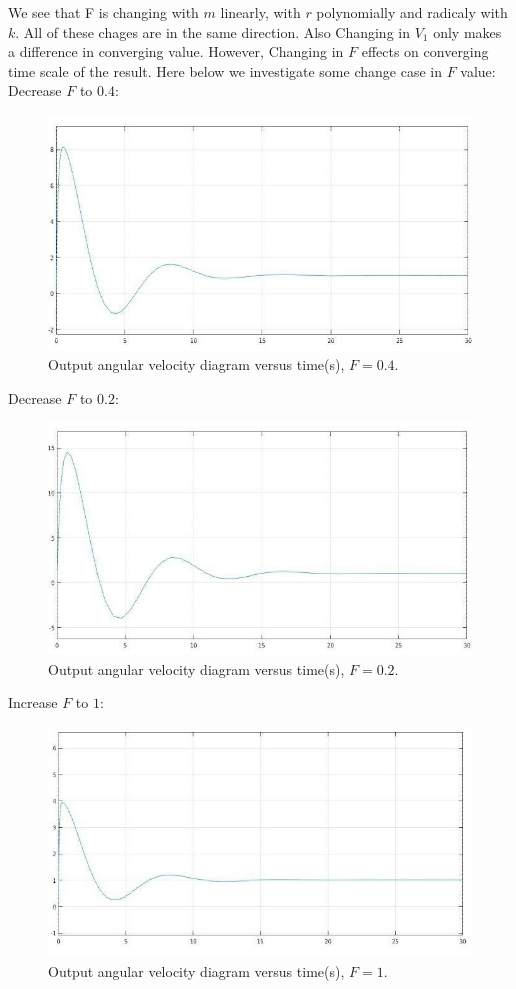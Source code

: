 \documentclass[11pt]{scrartcl} %
\begin{document}
We see that F is changing with $m$ linearly, with $r$ polynomially and radicaly with $k$. All of these chages are in the same direction. Also Changing in $V_1$ only makes a difference in converging value. However, Changing in $F$ effects on converging time scale of the result. Here below  we investigate some change case in $F$ value:\\
\newline
Decrease $F$ to $0.4$:
\begin{figure}[h] 
	\centering
	\includegraphics[width=0.6\columnwidth]{images/p12.jpg}
	\caption{Output angular velocity diagram versus time(s), $F = 0.4$.}
\end{figure}
\newpage
Decrease $F$ to $0.2$:
\begin{figure}[h] 
	\centering
	\includegraphics[width=0.6\columnwidth]{images/p11.jpg}
	\caption{Output angular velocity diagram versus time(s), $F = 0.2$.}
\end{figure} \newline
Increase $F$ to $1$:
\begin{figure}[h] 
	\centering
	\includegraphics[width=0.55\columnwidth]{images/p13.jpg}
	\caption{Output angular velocity diagram versus time(s), $F = 1$.}
\end{figure}
\end{document}
